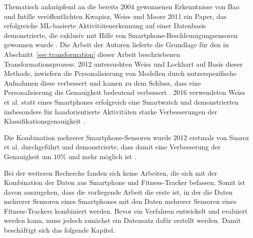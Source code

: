 Thematisch anknüpfend an die bereits 2004 gewonnenen Erkenntnisse von Bao und Intille veröffentlichten Kwapisz, Weiss und Moore 2011 ein Paper, das erfolgreiche \ac{ML}-basierte Aktivitätenerkennung auf einer Datenbasis demonstrierte, die exklusiv mit Hilfe von Smartphone-Beschleunigungsensoren gewonnen wurde \cite{Kwapisz2011}. Die Arbeit der Autoren lieferte die Grundlage für den in Abschnitt~\ref{sec:transformation} dieser Arbeit beschriebenen Transformationsprozess. 2012 untersuchten Weiss und Lockhart auf Basis dieser Methode, inwiefern die Personalisierung von Modellen durch nutzerspezifische Aufnahmen diese verbessert und kamen zu dem Schluss, dass eine Personalisierung die Genauigkeit bedeutend verbessert \cite{Weiss2012}. 2016 verwendeten Weiss et al. statt eines Smartphones erfolgreich eine Smartwatch und demonstrierten insbesondere für handorientierte Aktivitäten starke Verbesserungen der Klassifikationsgenauigkeit \cite{Weiss2016}.

Die Kombination mehrerer Smartphone-Sensoren wurde 2012 erstmals von Suarez et al. durchgeführt und demonstrierte, dass damit eine Verbesserung der Genauigkeit um $10 \%$ und mehr möglich ist \cite{Dernbach2012}.

Bei der weiteren Recherche fanden sich keine Arbeiten, die sich mit der Kombination der Daten aus Smartphone und Fitness-Tracker befassen. Somit ist davon auszugehen, dass die vorliegende Arbeit die erste ist, in der die Daten mehrerer Sensoren eines Smartphones mit den Daten mehrerer Sensoren eines Fitness-Trackers kombiniert werden. Bevor ein Verfahren entwickelt und evaluiert werden kann, muss jedoch zunächst ein Datensatz dafür erstellt werden. Damit beschäftigt sich das folgende Kapitel.

